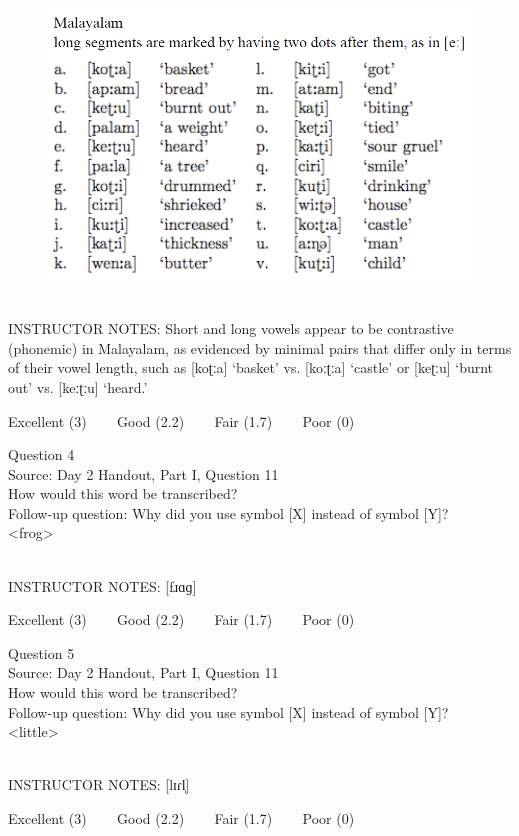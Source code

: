 \documentclass[12pt]{article}
\begin{document}
\begin{figure}[H]
\includegraphics{../images/malayalam.png}
\end{figure}

~\\
INSTRUCTOR NOTES: Short and long vowels appear to be contrastive (phonemic) in Malayalam, as evidenced by minimal pairs that differ only in terms of their vowel length, such as [koʈːa] ‘basket’ vs. [koːʈːa] ‘castle’ or [keʈːu] ‘burnt out’ vs. [keːʈːu] ‘heard.’


\vfill
Excellent (3) ~~~ Good (2.2) ~~~ Fair (1.7) ~~~ Poor (0)
\newpage

{\large Question 4}\\

Source: Day 2 Handout, Part I, Question 11\\

How would this word be transcribed?\\ Follow-up question: Why did you use symbol [X] instead of symbol [Y]?\\

<frog>


~\\
INSTRUCTOR NOTES: [fɹɑɡ]


\vfill
Excellent (3) ~~~ Good (2.2) ~~~ Fair (1.7) ~~~ Poor (0)
\newpage

{\large Question 5}\\

Source: Day 2 Handout, Part I, Question 11\\

How would this word be transcribed?\\ Follow-up question: Why did you use symbol [X] instead of symbol [Y]?\\

<little>


~\\
INSTRUCTOR NOTES: [lɪɾl̩]


\vfill
Excellent (3) ~~~ Good (2.2) ~~~ Fair (1.7) ~~~ Poor (0)
\newpage

\begin{center}
\textbf{{\color{red}{\HUGE END OF EXAM}}}\\

\end{center}
\newpage
\end{document}
